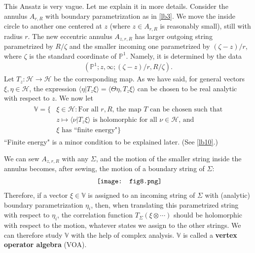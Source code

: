\documentclass[11pt,b5paper,notitlepage]{article}
\theoremstyle{definition}
\theoremstyle{plain}
\newcommand{\mc}{\mathcal}
\newcommand{\bk}[1]{\langle {#1}\rangle}
\newcommand{\Vbb}{\mathbb V}
\newcommand{\Pbb}{\mathbb P}
\numberwithin{equation}{section}
\begin{document}
This Ansatz is very vague. Let me explain it in more details. Consider the annulus $A_{r,R}$ with boundary parametrization as in \ref{lb3}. We move the inside circle to another one centered at $z$ (where $z\in A_{r,R}$ is reasonably small), still with radius $r$. The new eccentric annulus $A_{z,r,R}$ has larger outgoing string parametrized by $R/\zeta$ and the smaller incoming one parametrized by $(\zeta-z)/r$, where $\zeta$ is the standard coordinate of $\Pbb^1$. Namely, it is determined by the data
\begin{align}
(\Pbb^1;z,\infty;(\zeta-z)/r,R/\zeta).	\label{eq224}
\end{align}
Let $T_z:\mc H\rightarrow\mc H$ be the corresponding map. As we have said, for general vectors $\xi,\eta\in\mc H$, the expression $\bk{\eta|T_z\xi}=\bk{\Theta\eta,T_z\xi}$ can be chosen to be real analytic with respect to $z$. We now let
\begin{align}\label{eq2}
	\begin{aligned}
\Vbb=\{&\xi\in\mc H:\text{For all $r,R$, the map $T$ can be chosen such that} \\
	&\text{$z\mapsto\bk{\nu|T_z\xi}$ is holomorphic for all $\nu\in\mc H$, and}\\
	&\text{$\xi$ has ``finite energy"}\}		
	\end{aligned}	
\end{align}
``Finite energy" is a minor condition to be explained later. (See \ref{lb10}.)

We can sew $A_{z,r,R}$ with any $\Sigma$, and the motion of the smaller string inside the annulus becomes, after sewing, the motion of a boundary string of $\Sigma$: 
\begin{align}
	\vcenter{\hbox{{
				\texttt{[image: fig8.png]}}}}\label{eq176}
\end{align}
Therefore, if a vector $\xi\in \Vbb$ is assigned to an incoming string of $\Sigma$ with (analytic) boundary parametrization $\eta_i$, then, when translating this parametrized string with respect to $\eta_i$, the correlation function $T_\Sigma(\xi\otimes\cdots)$ should be holomorphic with respect to the motion, whatever states we assign to the other strings.  We can therefore study $\Vbb$ with the help of complex analysis. $\Vbb$ is called a \textbf{vertex operator algebra} (VOA).
\end{document}
